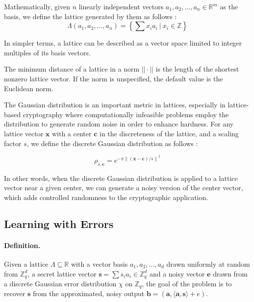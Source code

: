 \documentclass[11pt,
  titlepage=false,
  abstract=on,
]{scrreprt}
\begin{document}

Mathematically, given $n$ linearly independent vectors $a_1, a_2,..., a_n \in \mathbb{R}^m$ as the basis, we define the lattice generated by them as follows \cite{latticesIntro2004}:
\begin{equation*}
  \Lambda(a_1, a_2,..., a_n) = \left\{\sum x_ia_i\ |\ x_i \in \mathbb{Z}\right\} 
\end{equation*}

In simpler terms, a lattice can be described as a vector space limited to integer multiples of its basis vectors.

The minimum distance of a lattice in a norm $||\cdot||$ is the length of the shortest nonzero lattice vector. If the norm is unspecified, the default
value is the Euclidean norm.

The Gaussian distribution is an important metric in lattices, especially in lattice-based cryptography where computationally infeasible problems employ the distribution
to generate random noise in order to enhance hardness. For any lattice vector $\mathbf{x}$ with a center $\mathbf{c}$ in the discreteness of the lattice, and a scaling factor $s$,
we define the discrete Gaussian distribution as follows \cite{WCToAVGCase}:

\begin{equation*}
  \rho_{s,\mathbf{c}} = e^{-\pi {\| (\mathbf{x} - \mathbf{c}) / s\|}^2}
\end{equation*}

In other words, when the discrete Gaussian distribution is applied to a lattice vector near a given center, we can generate a noisy version of the center vector, which adds controlled randomness 
to the cryptographic application.

\subsection{Learning with Errors}
\paragraph{Definition.} Given a lattice $\Lambda \subseteq \mathbb{R}$ with a vector basis $a_1, a_2,..., a_d$ drawn uniformly at random from $\mathbb{Z}^d_q$, a secret lattice vector $\mathbf{s}=\sum s_ia_i \in \mathbb{Z}^d_q$ 
and a noisy vector $\mathbf{e}$ drawn from a discrete Gaussian error distribution $\chi$ on $\mathbb{Z}_q$, the goal of the problem is to recover $\mathbf{s}$ from the approximated, noisy output 
$\mathbf{b} = (\mathbf{a}, \langle \mathbf{a}, \mathbf{s} \rangle + e)$. \cite{regev2010learning}\\
\end{document}
